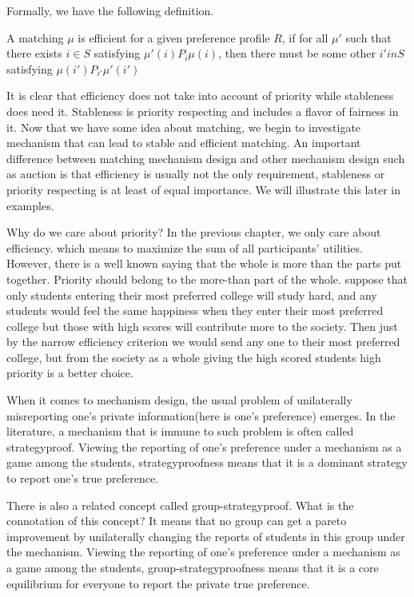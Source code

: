 Formally, we have the following definition.
\begin{definition}
A matching $\mu$ is efficient for a given preference profile $R$, if
for all $\mu'$ such that there exists $i \in S$ satisfying $\mu'(i)
P_i \mu(i)$, then there must be some other $i' in S$ satisfying
$\mu(i') P_{i'} \mu'(i')$
\end{definition}

It is clear that efficiency does not take into account of priority while stableness does need it. Stableness is priority respecting and includes a flavor of fairness in it. Now that we have some idea about matching, we begin to investigate mechanism that can lead to stable and efficient matching. An important difference between matching mechanism design and other mechanism design such as auction is that efficiency is usually not the only requirement, stableness or priority respecting is at least of equal importance. We will illustrate this later in examples.

Why do we care about priority? In the previous chapter, we only care about efficiency. which means to maximize the sum of all participants' utilities. However, there is a well known saying that the whole is more than the parts put together. Priority should belong to the more-than part of the whole. suppose that only students entering their most preferred college will study hard, and any students would feel the same happiness when they enter their most preferred college but those with high scores will contribute more to the society. Then just by the narrow efficiency criterion we would send any one to their most preferred college, but from the society as a whole giving the high scored students high priority is a better choice.

When it comes to mechanism design, the usual problem of unilaterally misreporting one's private information(here is one's preference) emerges. In the literature, a mechanism that is immune to such problem is often called strategyproof. Viewing the reporting of one's preference under a mechanism as a game among the students, strategyproofness  means that it is a dominant strategy to report one's true preference. 

There is also a related concept called group-strategyproof. What is the connotation of this concept? It means that no group can get a pareto improvement by unilaterally changing the reports of students in this group under the mechanism. Viewing the reporting of one's preference under a mechanism as a game among the students, group-strategyproofness means that it is a core equilibrium for everyone to report the private true preference.




